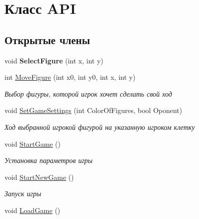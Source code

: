 \hypertarget{classAPI}{\section{Класс A\+P\+I}
\label{classAPI}
}
\subsection*{Открытые члены}
\begin{DoxyCompactItemize}
\item 
\hypertarget{classAPI_ae502ed7d94f86e5007b9d8e7794f0e8f}{void {\bfseries Select\+Figure} (int x, int y)}\label{classAPI_ae502ed7d94f86e5007b9d8e7794f0e8f}

\item 
\hypertarget{classAPI_a4e06a33fd2468704bcc53bb8e2e769e0}{int \hyperlink{classAPI_a4e06a33fd2468704bcc53bb8e2e769e0}{Move\+Figure} (int x0, int y0, int x, int y)}\label{classAPI_a4e06a33fd2468704bcc53bb8e2e769e0}

\begin{DoxyCompactList}\small\item\em Выбор фигуры, которой игрок хочет сделать свой ход \end{DoxyCompactList}\item 
\hypertarget{classAPI_a6596a30f24a77cd1d2821dae55e87702}{void \hyperlink{classAPI_a6596a30f24a77cd1d2821dae55e87702}{Set\+Game\+Settings} (int Color\+Of\+Figures, bool Oponent)}\label{classAPI_a6596a30f24a77cd1d2821dae55e87702}

\begin{DoxyCompactList}\small\item\em Ход выбранной игрокой фигурой на указанную игроком клетку \end{DoxyCompactList}\item 
\hypertarget{classAPI_a5398b46cb85a8f028fe430110066dd61}{void \hyperlink{classAPI_a5398b46cb85a8f028fe430110066dd61}{Start\+Game} ()}\label{classAPI_a5398b46cb85a8f028fe430110066dd61}

\begin{DoxyCompactList}\small\item\em Установка параметров игры \end{DoxyCompactList}\item 
\hypertarget{classAPI_a7f7e264073e3d6162a0992fe52ef8e82}{void \hyperlink{classAPI_a7f7e264073e3d6162a0992fe52ef8e82}{Start\+New\+Game} ()}\label{classAPI_a7f7e264073e3d6162a0992fe52ef8e82}

\begin{DoxyCompactList}\small\item\em Запуск игры \end{DoxyCompactList}\item 
\hypertarget{classAPI_a7afde1ccf05be314d6a9c6194a556c7a}{void \hyperlink{classAPI_a7afde1ccf05be314d6a9c6194a556c7a}{Load\+Game} ()}\label{classAPI_a7afde1ccf05be314d6a9c6194a556c7a}


\end{DoxyCompactItemize}
